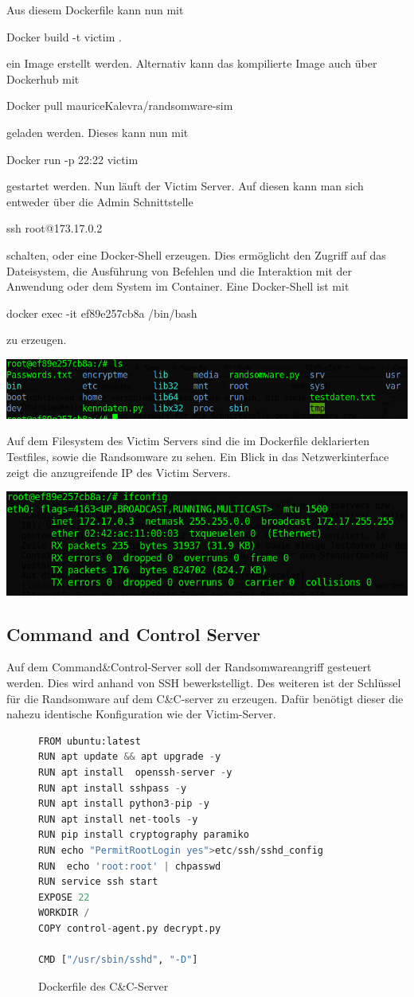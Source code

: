 \documentclass[12pt]{article}
\begin{document}
Aus diesem Dockerfile kann nun mit \colorbox{mshadecolor}{\parbox{0.31\textwidth}{Docker build -t victim .}} ein Image erstellt werden. Alternativ kann das kompilierte Image auch über Dockerhub mit \colorbox{mshadecolor}{\parbox{0.61\textwidth}{Docker pull mauriceKalevra/randsomware-sim}} geladen werden. Dieses kann nun mit \colorbox{mshadecolor}{\parbox{0.36\textwidth}{Docker run -p 22:22 victim}} gestartet werden. Nun läuft der Victim Server. Auf diesen kann man sich entweder über die Admin Schnittstelle  \colorbox{mshadecolor}{\parbox{0.26\textwidth}{ssh root@173.17.0.2}} schalten, oder eine Docker-Shell erzeugen. Dies ermöglicht  den Zugriff auf das Dateisystem, die Ausführung von Befehlen und die Interaktion mit der Anwendung oder dem System im Container. Eine Docker-Shell ist mit \colorbox{mshadecolor}{\parbox{0.51\textwidth}{docker exec -it ef89e257cb8a /bin/bash}} zu erzeugen. 
\begin{center}
 \includegraphics[scale=0.5]{victimS.png}
\end{center}
Auf dem Filesystem des Victim Servers sind die im Dockerfile deklarierten Testfiles, sowie die Randsomware zu sehen. Ein Blick in das Netzwerkinterface zeigt die anzugreifende IP des Victim Servers.
\begin{center}
 \includegraphics[scale=0.3]{victimIp.png}
\end{center}
\newpage
\subsection{Command and Control Server}
Auf dem Command\&Control-Server soll der Randsomwareangriff gesteuert werden. Dies wird anhand von SSH bewerkstelligt. Des weiteren ist der Schlüssel für die Randsomware auf dem C\&C-server zu erzeugen. Dafür benötigt dieser die nahezu identische Konfiguration wie der Victim-Server.
\begin{figure}[h]
\caption{Dockerfile des C\&C-Server}
\begin{lstlisting}[language=python, style=code]
FROM ubuntu:latest
RUN apt update && apt upgrade -y 
RUN apt install  openssh-server -y
RUN apt install sshpass -y
RUN apt install python3-pip -y 
RUN apt install net-tools -y 
RUN pip install cryptography paramiko
RUN echo "PermitRootLogin yes">etc/ssh/sshd_config
RUN  echo 'root:root' | chpasswd
RUN service ssh start
EXPOSE 22
WORKDIR /
COPY control-agent.py decrypt.py 

CMD ["/usr/sbin/sshd", "-D"]
\end{lstlisting}

\end{figure}
\end{document}
